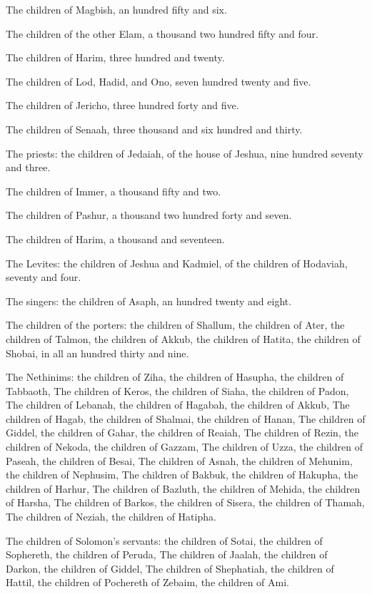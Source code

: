 \Verse The children of Magbish, an hundred fifty and six.

\Verse The children of the other Elam, a thousand two hundred fifty and four.

\Verse The children of Harim, three hundred and twenty.

\Verse The children of Lod, Hadid, and Ono, seven hundred twenty and five.

\Verse The children of Jericho, three hundred forty and five.

\Verse The children of Senaah, three thousand and six hundred and thirty.

\Verse The priests: the children of Jedaiah, of the house of Jeshua, nine hundred seventy and three.

\Verse The children of Immer, a thousand fifty and two.

\Verse The children of Pashur, a thousand two hundred forty and seven.

\Verse The children of Harim, a thousand and seventeen.

\Verse The Levites: the children of Jeshua and Kadmiel, of the children of Hodaviah, seventy and four.

\Verse The singers: the children of Asaph, an hundred twenty and eight.

\Verse The children of the porters: the children of Shallum, the children of Ater, the children of Talmon, the children of Akkub, the children of Hatita, the children of Shobai, in all an hundred thirty and nine.

\Verse The Nethinims: the children of Ziha, the children of Hasupha, the children of Tabbaoth, \Verse The children of Keros, the children of Siaha, the children of Padon, \Verse The children of Lebanah, the children of Hagabah, the children of Akkub, \Verse The children of Hagab, the children of Shalmai, the children of Hanan, \Verse The children of Giddel, the children of Gahar, the children of Reaiah, \Verse The children of Rezin, the children of Nekoda, the children of Gazzam, \Verse The children of Uzza, the children of Paseah, the children of Besai, \Verse The children of Asnah, the children of Mehunim, the children of Nephusim, \Verse The children of Bakbuk, the children of Hakupha, the children of Harhur, \Verse The children of Bazluth, the children of Mehida, the children of Harsha, \Verse The children of Barkos, the children of Sisera, the children of Thamah, \Verse The children of Neziah, the children of Hatipha.

\Verse The children of Solomon's servants: the children of Sotai, the children of Sophereth, the children of Peruda, \Verse The children of Jaalah, the children of Darkon, the children of Giddel, \Verse The children of Shephatiah, the children of Hattil, the children of Pochereth of Zebaim, the children of Ami.

